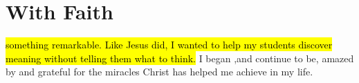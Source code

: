\documentclass{report}%
\begin{document}
\section*{With Faith}
\hl{something remarkable.   Like Jesus did, I wanted to help my students discover meaning without telling them what to think.} %
I began ,and continue to be, amazed by and grateful for the miracles Christ has helped me achieve in my life. 


\end{document}
